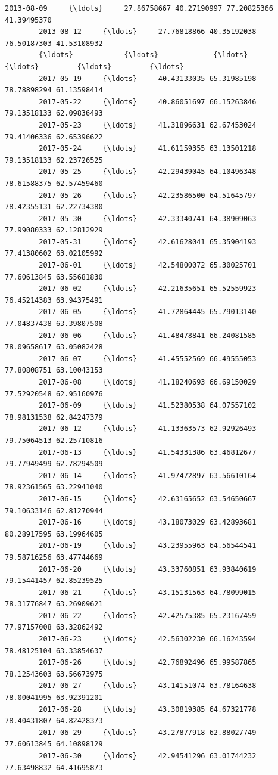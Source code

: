 \documentclass[11pt]{article}
\begin{document}
\begin{Verbatim}[commandchars=\\\{\}]
        2013-08-09     {\ldots}     27.86758667 40.27190997 77.20825366 41.39495370   
        2013-08-12     {\ldots}     27.76818866 40.35192038 76.50187303 41.53108932   
        {\ldots}            {\ldots}             {\ldots}         {\ldots}         {\ldots}         {\ldots}   
        2017-05-19     {\ldots}     40.43133035 65.31985198 78.78898294 61.13598414   
        2017-05-22     {\ldots}     40.86051697 66.15263846 79.13518133 62.09836493   
        2017-05-23     {\ldots}     41.31896631 62.67453024 79.41406336 62.65396622   
        2017-05-24     {\ldots}     41.61159355 63.13501218 79.13518133 62.23726525   
        2017-05-25     {\ldots}     42.29439045 64.10496348 78.61588375 62.57459460   
        2017-05-26     {\ldots}     42.23586500 64.51645797 78.42355131 62.22734380   
        2017-05-30     {\ldots}     42.33340741 64.38909063 77.99080333 62.12812929   
        2017-05-31     {\ldots}     42.61628041 65.35904193 77.41380602 63.02105992   
        2017-06-01     {\ldots}     42.54800072 65.30025701 77.60613845 63.55681830   
        2017-06-02     {\ldots}     42.21635651 65.52559923 76.45214383 63.94375491   
        2017-06-05     {\ldots}     41.72864445 65.79013140 77.04837438 63.39807508   
        2017-06-06     {\ldots}     41.48478841 66.24081585 78.09658617 63.05082428   
        2017-06-07     {\ldots}     41.45552569 66.49555053 77.80808751 63.10043153   
        2017-06-08     {\ldots}     41.18240693 66.69150029 77.52920548 62.95160976   
        2017-06-09     {\ldots}     41.52380538 64.07557102 78.98131538 62.84247379   
        2017-06-12     {\ldots}     41.13363573 62.92926493 79.75064513 62.25710816   
        2017-06-13     {\ldots}     41.54331386 63.46812677 79.77949499 62.78294509   
        2017-06-14     {\ldots}     41.97472897 63.56610164 78.92361565 63.22941040   
        2017-06-15     {\ldots}     42.63165652 63.54650667 79.10633146 62.81270944   
        2017-06-16     {\ldots}     43.18073029 63.42893681 80.28917595 63.19964605   
        2017-06-19     {\ldots}     43.23955963 64.56544541 79.58716256 63.47744669   
        2017-06-20     {\ldots}     43.33760851 63.93840619 79.15441457 62.85239525   
        2017-06-21     {\ldots}     43.15131563 64.78099015 78.31776847 63.26909621   
        2017-06-22     {\ldots}     42.42575385 65.23167459 77.97157008 63.32862492   
        2017-06-23     {\ldots}     42.56302230 66.16243594 78.48125104 63.33854637   
        2017-06-26     {\ldots}     42.76892496 65.99587865 78.12543603 63.56673975   
        2017-06-27     {\ldots}     43.14151074 63.78164638 78.00041995 63.92391201   
        2017-06-28     {\ldots}     43.30819385 64.67321778 78.40431807 64.82428373   
        2017-06-29     {\ldots}     43.27877918 62.88027749 77.60613845 64.10898129   
        2017-06-30     {\ldots}     42.94541296 63.01744232 77.63498832 64.41695873   
        

\end{Verbatim}
\end{document}
